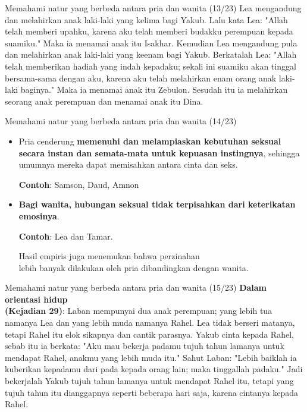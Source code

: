 \documentclass{beamer}
\theoremstyle{mystyle}
\let\emph\relax %
\begin{document}
\begin{frame}{Memahami natur yang berbeda antara pria dan wanita (13/23)}
Lea mengandung dan melahirkan anak laki-laki yang kelima bagi Yakub. Lalu kata Lea: "Allah telah memberi upahku, karena aku telah memberi budakku perempuan kepada suamiku." Maka ia menamai anak itu Isakhar. Kemudian Lea mengandung pula dan melahirkan anak laki-laki yang keenam bagi Yakub. Berkatalah Lea: "Allah telah memberikan hadiah yang indah kepadaku; sekali ini suamiku akan tinggal bersama-sama dengan aku, karena aku telah melahirkan enam orang anak laki-laki baginya." Maka ia menamai anak itu Zebulon. Sesudah itu ia melahirkan seorang anak perempuan dan menamai anak itu Dina. 	
\end{frame}

\begin{frame}{Memahami natur yang berbeda antara pria dan wanita (14/23)}
		\begin{itemize}
		\item Pria cenderung \textbf{memenuhi dan melampiaskan kebutuhan seksual secara instan dan semata-mata untuk kepuasan instingnya}, sehingga umumnya mereka dapat memisahkan antara cinta dan seks.
		
		\bigskip
		
		\textbf{Contoh}: Samson, Daud, Amnon 
		
		\bigskip
		
		\item \textbf{Bagi wanita, hubungan seksual tidak terpisahkan dari keterikatan emosinya}.
		
		\bigskip
		
		\textbf{Contoh}: Lea dan Tamar.
		
		\bigskip
		
		Hasil empiris juga menemukan bahwa perzinahan \\
		lebih banyak dilakukan oleh pria dibandingkan dengan wanita. 		
	\end{itemize}			
\end{frame}

\begin{frame}{Memahami natur yang berbeda antara pria dan wanita (15/23)}
	\textbf{Dalam orientasi hidup}\\
	\emph{Yakub} \textbf{(Kejadian 29)}: Laban mempunyai dua anak perempuan; yang lebih tua namanya Lea dan yang lebih muda namanya Rahel. Lea tidak berseri matanya, tetapi Rahel itu elok sikapnya dan cantik parasnya. Yakub cinta kepada Rahel, sebab itu ia berkata: "Aku mau bekerja padamu tujuh tahun lamanya untuk mendapat Rahel, anakmu yang lebih muda itu." Sahut Laban: "Lebih baiklah ia kuberikan kepadamu dari pada kepada orang lain; maka tinggallah padaku." Jadi bekerjalah Yakub tujuh tahun lamanya untuk mendapat Rahel itu, tetapi yang tujuh tahun itu dianggapnya seperti beberapa hari saja, karena cintanya kepada Rahel. 
\end{frame}
\end{document}
